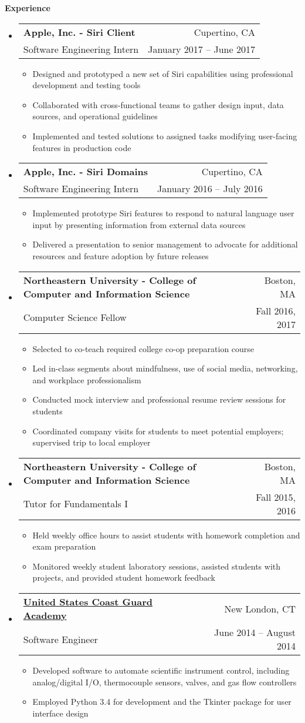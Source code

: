 \documentclass[letterpaper,10.6pt]{article}
\makeatletter
\newcommand{\resitem}[1]{\item #1 \vspace{-2pt}}
\newcommand{\resheading}[1]{{\large \colorbox{mygrey}{\begin{minipage}{\textwidth}{\textbf{#1 \vphantom{p\^{E}}}}\end{minipage}}}}
\newcommand{\ressubheading}[4]{
\begin{tabular*}{6.8in}{l@{\extracolsep{\fill}}r}
		\textbf{#1} & #2 \\
		\small{#3} & \small{#4} \\
\end{tabular*}\vspace{-6pt}}
\makeatother
\begin{document}
\resheading{Experience}
	\begin{itemize}[leftmargin=*]
		\item[]
			\ressubheading{Apple, Inc. - \small{Siri Client}}{Cupertino, CA}{Software Engineering Intern}{January 2017 -- June 2017}
			{\footnotesize
				\begin{itemize}
					\resitem{Designed and prototyped a new set of Siri capabilities using professional development and testing tools}
					\resitem{Collaborated with cross-functional teams to gather design input, data sources, and operational guidelines}
					\resitem{Implemented and tested solutions to assigned tasks modifying user-facing features in production code}
				\end{itemize}}
		\item[]
			\ressubheading{Apple, Inc. - \small{Siri Domains}}{Cupertino, CA}{Software Engineering Intern}{January 2016 -- July 2016}
			{\footnotesize
				\begin{itemize}
					\resitem{Implemented prototype Siri features to respond to natural language user input by presenting information from external data sources}
					\resitem{Delivered a presentation to senior management to advocate for additional resources and feature adoption by future releases}
				\end{itemize}}
		\item[]
			\ressubheading{Northeastern University - \small{College of Computer and Information Science}}{Boston, MA}{Computer Science Fellow}{Fall 2016, 2017}
			{\footnotesize
				\begin{itemize}
					\resitem{Selected to co-teach required college co-op preparation course}
					\resitem{Led in-class segments about mindfulness, use of social media, networking, and workplace professionalism}
					\resitem{Conducted mock interview and professional resume review sessions for students}
					\resitem{Coordinated company visits for students to meet potential employers; supervised trip to local employer}
			\end{itemize}}
		\item[]
			\ressubheading{Northeastern University - \small{College of Computer and Information Science}}{Boston, MA}{Tutor for Fundamentals I}{Fall 2015, 2016}
			{\footnotesize
				\begin{itemize}
					\resitem{Held weekly office hours to assist students with homework completion and exam preparation}
					\resitem{Monitored weekly student laboratory sessions, assisted students with projects, and provided student homework feedback}
				\end{itemize}}
		\item[] 
			\ressubheading{\href{http://www.uscga.edu}{United States Coast Guard Academy}}{New London, CT}
				{Software Engineer}{June 2014 -- August 2014}
				{\footnotesize
				\begin{itemize}
					\resitem{Developed software to automate scientific instrument control, including analog/digital I/O, thermocouple sensors, valves, and gas flow controllers}
					\resitem{Employed Python 3.4 for development and the Tkinter package for user interface design}
				\end{itemize}}
	\end{itemize} 
\end{document}
